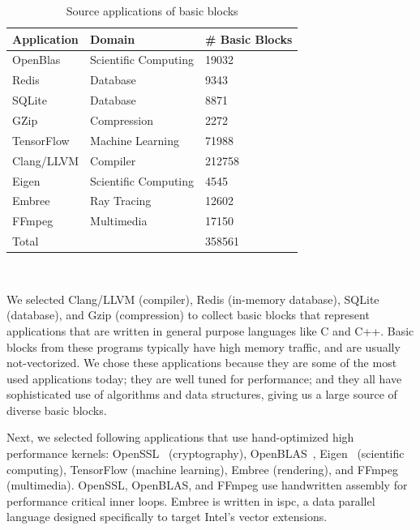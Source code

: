 \begin{table}
\begin{tabular}{|p{}|p{}|p{}|}
\hline
\textbf{Application} & \textbf{Domain} & \textbf{\# Basic Blocks} \\

\hline
OpenBlas & Scientific Computing & 19032 \\

\hline
Redis & Database & 9343  \\

\hline
SQLite & Database & 8871 \\

\hline
GZip & Compression & 2272 \\

\hline
TensorFlow & Machine Learning & 71988 \\

\hline 
Clang/LLVM & Compiler & 212758 \\

\hline
Eigen & Scientific Computing & 4545 \\

\hline
Embree & Ray Tracing & 12602 \\

\hline
FFmpeg & Multimedia & 17150 \\

\hline
\multicolumn{2}{|l|}{Total}  & 358561 \\


\hline
\end{tabular}
\\
\caption{Source applications of basic blocks}
\label{tab:apps}
\end{table}

We selected Clang/LLVM\cite{llvm} (compiler),
Redis (in-memory database), SQLite (database), and Gzip (compression)
to collect basic blocks that represent
applications that are written in general purpose languages
like C and C++.
Basic blocks from these programs
typically have high memory traffic, and are usually not-vectorized.
We chose these applications because they are some of the most used
applications today; they are well tuned for performance;
and they all have sophisticated use of algorithms and data structures,
giving us a large source of diverse basic blocks.

Next, we selected following applications that use hand-optimized high performance kernels:
OpenSSL~\cite{openssl} (cryptography), OpenBLAS~\cite{openblas}, Eigen~\cite{eigen} (scientific computing),
TensorFlow\cite{tensorflow} (machine learning),
Embree\cite{embree} (rendering), and FFmpeg (multimedia).
OpenSSL, OpenBLAS, and FFmpeg use handwritten assembly for performance critical inner loops.
Embree is written in ispc\cite{ispc}, a data parallel language
designed specifically to target Intel's vector extensions.

